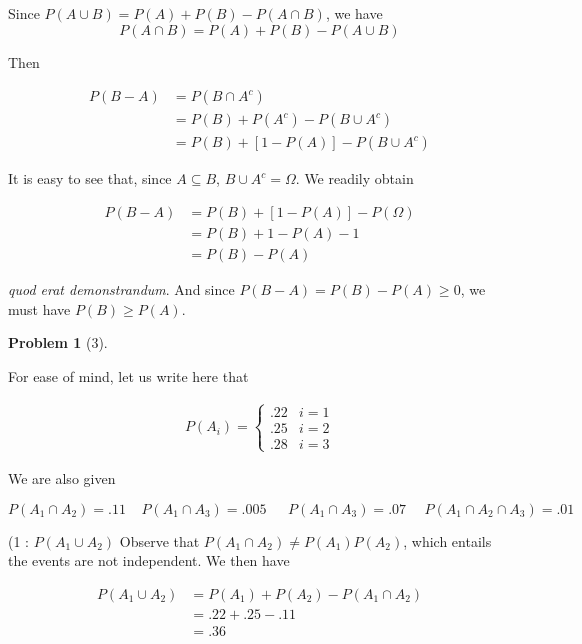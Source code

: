 \documentclass[a4paper, 12pt]{article}
\newtheorem{problem}{Problem}
\newtheorem{problem}{Problem}
\begin{document}
Since $P(A \cup B) = P(A) + P(B) - P(A \cap B)$, we have 
$$P(A \cap B) = P(A) + P(B) - P(A \cup B)$$ 

Then 

\begin{align*}
    P(B - A) &= P(B \cap A^c) \\ 
             &=P(B) + P(A^c) - P(B \cup A^c)\\ 
             &=P(B) + \left[ 1 - P(A) \right] - P(B \cup A^c)
\end{align*}

It is easy to see that, since $A \subseteq B$, $B \cup A^c = \Omega$.
We readily obtain


\begin{align*}
    P(B - A) &= P(B) + \left[ 1 - P(A) \right] - P(\Omega) \\ 
    &=P(B) + 1 - P(A) - 1 \\ 
    &= P(B) - P(A)
\end{align*}

\textit{quod erat demonstrandum}. And since $P(B - A) = P(B) - P(A) \geq 0$, we must have 
$P(B) \geq P(A)$.

\pagebreak 

\begin{problem}[3]
    
\end{problem}

 
For ease of mind, let us write here that 

\begin{align*}
    P(A_i) = \begin{cases}
        .22 & i = 1 \\ 
        .25 & i = 2 \\ 
        .28 & i = 3
    \end{cases}
\end{align*}

We are also given 

\begin{equation*}
    P(A_1 \cap A_2) = .11 ~ ~ ~ ~ ~ P(A_1 \cap A_3) = .005 ~ ~ ~ ~ ~ ~ ~ P(A_1 \cap A_3) = .07 ~ ~ ~ ~ ~ ~ P(A_1 \cap A_2 \cap A_3) = .01
\end{equation*}

    (1 : $P(A_1 \cup A_2)$ Observe that $P(A_1 \cap A_2) \neq P(A_1)P(A_2)$,
    which entails the events are not independent. We then have 

    \begin{align*}
        P(A_1 \cup A_2) &= P(A_1) + P(A_2) - P(A_1 \cap A_2) \\ 
                        &= .22 + .25 - .11 \\ 
                        &= .36
    \end{align*}
\end{document}
